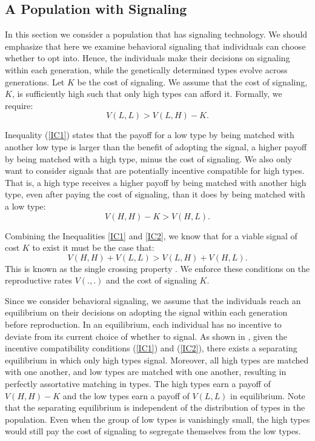 \subsection{A Population with Signaling}

 In this section we consider a population that has signaling technology. We should emphasize that here we examine behavioral signaling that individuals can choose whether to opt into. Hence, the individuals make their decisions on signaling within each generation, while the genetically determined types evolve across generations. Let $K$ be the cost of signaling. %
 We assume that the cost of signaling, $K$, is sufficiently high such that only high types can afford it.  Formally, we require: \begin{equation} \label{IC1}
     V(L,L)>V(L,H)-K.
 \end{equation}
 
Inequality (\ref{IC1}) states that the payoff for a low type by being matched with another low type is larger than the benefit of adopting the signal, a higher payoff by being matched with a high type, minus the cost of signaling. We also only want to consider signals that are potentially incentive compatible for high types. That is, a high type receives a higher payoff by being matched with another high type, even after paying the cost of signaling, than it does by being matched with a low type: \begin{equation}\label{IC2}
     V(H,H)-K>V(H,L).
 \end{equation}
 
 Combining the Inequalities \ref{IC1} and \ref{IC2}, we know that for a viable signal of cost $K$ to exist it must be the case that: \begin{equation}
     V(H,H)+V(L,L)>V(L,H)+V(H,L).
 \end{equation}
 This is known as the single crossing property \citep{Zahavi1975, Spence1973}.
 We enforce these conditions on the reproductive rates $V(.,.)$ and the cost of signaling $K$.
 
 Since we consider behavioral signaling, we assume that the individuals reach an equilibrium on their decisions on adopting the signal within each generation before reproduction. In an equilibrium, each individual has no incentive to deviate from its current choice of whether to signal. As shown in \cite{Spence1973}, given the incentive compatibility conditions (\ref{IC1}) and (\ref{IC2}), there exists a separating equilibrium in which only high types signal. Moreover, all high types are matched with one another, and low types are matched with one another, resulting in perfectly assortative matching in types. The high types earn a payoff of $V(H, H)-K$ and the low types earn a payoff of $V(L, L)$ in equilibrium. Note that the separating equilibrium is independent of the distribution of types in the population. Even when the group of low types is vanishingly small, the high types would still pay the cost of signaling to segregate themselves from the low types.

